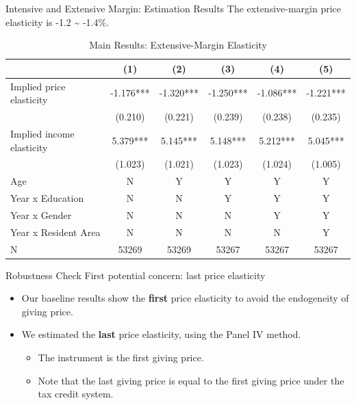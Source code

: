 \documentclass[
  ignorenonframetext,
]{beamer}
\providecommand{\tightlist}{%
  \setlength{\itemsep}{0pt}\setlength{\parskip}{0pt}}
\begin{document}
\begin{frame}{Intensive and Extensive Margin: Estimation Results}
\protect\hypertarget{intensive-and-extensive-margin-estimation-results-1}{}
The extensive-margin price elasticity is -1.2 \textasciitilde{} -1.4\%.

\begin{table}

\caption{\label{tab:kableEstimateElasticityPart2Slide2}Main Results: Extensive-Margin Elasticity}
\centering
\fontsize{7}{9}\selectfont
\begin{tabular}[t]{lccccc}
\toprule
 & (1) & (2) & (3) & (4) & (5)\\
\midrule
Implied price elasticity & -1.176*** & -1.320*** & -1.250*** & -1.086*** & -1.221***\\
 & (0.210) & (0.221) & (0.239) & (0.238) & (0.235)\\
Implied income elasticity & 5.379*** & 5.145*** & 5.148*** & 5.212*** & 5.045***\\
 & (1.023) & (1.021) & (1.023) & (1.024) & (1.005)\\
Age & N & Y & Y & Y & Y\\
Year x Education & N & N & Y & Y & Y\\
Year x Gender & N & N & N & Y & Y\\
Year x Resident Area & N & N & N & N & Y\\
N & 53269 & 53269 & 53267 & 53267 & 53267\\
\bottomrule
\end{tabular}
\end{table}
\end{frame}

\begin{frame}{Robustness Check}
\protect\hypertarget{robustness-check}{}
First potential concern: last price elasticity

\begin{itemize}
\tightlist
\item
  Our baseline results show the \textbf{first} price elasticity to avoid the endogeneity of giving price.
\item
  We estimated the \textbf{last} price elasticity, using the Panel IV method.

  \begin{itemize}
  \tightlist
  \item
    The instrument is the first giving price.
  \item
    Note that the last giving price is equal to the first giving price under the tax credit system.
  \end{itemize}
\end{itemize}
\end{frame}
\end{document}
